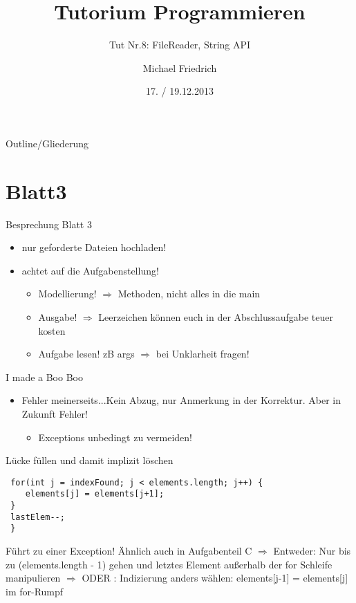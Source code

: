 \documentclass[18pt]{beamer}
\title[Prog Tut Nr. 8]{Tutorium Programmieren}
\subtitle{Tut Nr.8: FileReader, String API}
\author{Michael Friedrich}
\date{17. / 19.12.2013}
\institute{Institut f\"ur theoretische Informatik}
\begin{document}

\begin{frame}
	\titlepage
\end{frame}

\begin{frame}{Outline/Gliederung}
	\tableofcontents
\end{frame}

\section{Blatt3}
\begin{frame}{Besprechung Blatt 3}\pause
\begin{itemize}
	\item nur geforderte Dateien hochladen! \pause
	\item achtet auf die Aufgabenstellung! \pause
	\begin{itemize}
		\item Modellierung! $\Rightarrow$ Methoden, nicht alles in die main \pause
		\item Ausgabe! $\Rightarrow$ Leerzeichen können euch in der Abschlussaufgabe teuer kosten\pause
		\item Aufgabe lesen! zB args $\Rightarrow$ bei Unklarheit fragen!
	\end{itemize}
\end{itemize}
\end{frame}

\begin{frame}[fragile]{I made a Boo Boo}\pause
\begin{itemize}
	\item Fehler meinerseits...Kein Abzug, nur Anmerkung in der Korrektur. Aber in Zukunft Fehler!\pause
\begin{itemize}
	\item Exceptions unbedingt zu vermeiden!
\end{itemize}
\end{itemize}
\begin{block}{Lücke füllen und damit implizit löschen}\pause
\begin{lstlisting}
 for(int j = indexFound; j < elements.length; j++) {
    elements[j] = elements[j+1];
 } 
 lastElem--;
 }
\end{lstlisting}
Führt zu einer Exception! Ähnlich auch in Aufgabenteil C \newline \pause
$\Rightarrow$ Entweder: Nur bis zu (elements.length - 1) gehen und letztes Element außerhalb der for Schleife manipulieren \newline \pause
$\Rightarrow$ ODER : Indizierung anders wählen: elements[j-1] = elements[j] im for-Rumpf
\end{block}
\end{frame}
\end{document}
